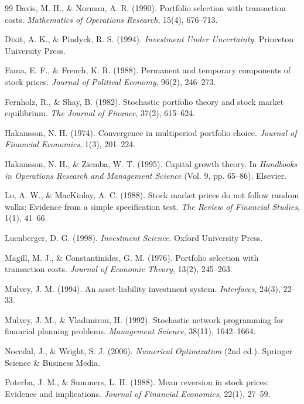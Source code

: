 \documentclass[11pt,a4paper]{report}
\numberwithin{equation}{chapter}
\begin{document}
\begin{thebibliography}{99}
Davis, M. H., \& Norman, A. R. (1990).
\newblock Portfolio selection with transaction costs.
\newblock \emph{Mathematics of Operations Research}, 15(4), 676--713.

Dixit, A. K., \& Pindyck, R. S. (1994).
\newblock \emph{Investment Under Uncertainty}.
\newblock Princeton University Press.

Fama, E. F., \& French, K. R. (1988).
\newblock Permanent and temporary components of stock prices.
\newblock \emph{Journal of Political Economy}, 96(2), 246--273.

Fernholz, R., \& Shay, B. (1982).
\newblock Stochastic portfolio theory and stock market equilibrium.
\newblock \emph{The Journal of Finance}, 37(2), 615--624.

Hakansson, N. H. (1974).
\newblock Convergence in multiperiod portfolio choice.
\newblock \emph{Journal of Financial Economics}, 1(3), 201--224.

Hakansson, N. H., \& Ziemba, W. T. (1995).
\newblock Capital growth theory.
\newblock In \emph{Handbooks in Operations Research and Management Science} (Vol. 9, pp. 65--86). Elsevier.

Lo, A. W., \& MacKinlay, A. C. (1988).
\newblock Stock market prices do not follow random walks: Evidence from a simple specification test.
\newblock \emph{The Review of Financial Studies}, 1(1), 41--66.

Luenberger, D. G. (1998).
\newblock \emph{Investment Science}.
\newblock Oxford University Press.

Magill, M. J., \& Constantinides, G. M. (1976).
\newblock Portfolio selection with transaction costs.
\newblock \emph{Journal of Economic Theory}, 13(2), 245--263.

Mulvey, J. M. (1994).
\newblock An asset-liability investment system.
\newblock \emph{Interfaces}, 24(3), 22--33.

Mulvey, J. M., \& Vladimirou, H. (1992).
\newblock Stochastic network programming for financial planning problems.
\newblock \emph{Management Science}, 38(11), 1642--1664.

Nocedal, J., \& Wright, S. J. (2006).
\newblock \emph{Numerical Optimization} (2nd ed.).
\newblock Springer Science \& Business Media.

Poterba, J. M., \& Summers, L. H. (1988).
\newblock Mean reversion in stock prices: Evidence and implications.
\newblock \emph{Journal of Financial Economics}, 22(1), 27--59.


\end{thebibliography}
\end{document}
